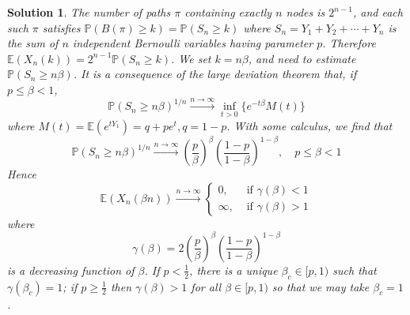 \documentclass[12pt]{amsart}
\newtheorem*{solution}{Solution}
\begin{document}
\begin{solution}
The number of paths $\pi$ containing exactly $n$ nodes is $2^{n-1}$, and each such $\pi$ satisfies $\mathbb{P}(B(\pi) \geq k)=\mathbb{P}(S_n \geq k)$ where $S_n=Y_1+Y_2+\cdots+Y_n$ is the sum of $n$ independent Bernoulli variables having parameter $p$. Therefore $\mathbb{E}(X_n(k))=2^{n-1} \mathbb{P}(S_n \geq k)$. We set $k=n \beta$, and need to estimate $\mathbb{P}(S_n \geq n \beta)$. It is a consequence of the large deviation theorem that, if $p \leq \beta<1$,
$$
\mathbb{P}(S_n \geq n \beta)^{1 / n} \xrightarrow{n \rightarrow \infty} \inf _{t>0}\{e^{-t \beta} M(t)\}
$$
where $M(t)=\mathbb{E}(e^{t Y_1})=q+p e^t, q=1-p$. With some calculus, we find that
$$
\mathbb{P}(S_n \geq n \beta)^{1 / n} \xrightarrow{n \rightarrow \infty}(\frac{p}{\beta})^\beta(\frac{1-p}{1-\beta})^{1-\beta}, \quad p \leq \beta<1
$$
Hence
$$
\mathbb{E}(X_n(\beta n)) \xrightarrow{n \rightarrow \infty} \begin{cases}0, & \text { if } \gamma(\beta)<1 \\ \infty, & \text { if } \gamma(\beta)>1\end{cases}
$$
where
$$
\gamma(\beta)=2(\frac{p}{\beta})^\beta(\frac{1-p}{1-\beta})^{1-\beta}
$$
is a decreasing function of $\beta$. If $p<\frac{1}{2}$, there is a unique $\beta_c \in[p, 1)$ such that $\gamma(\beta_c)=1$; if $p \geq \frac{1}{2}$ then $\gamma(\beta)>1$ for all $\beta \in[p, 1)$ so that we may take $\beta_c=1$.


\end{solution}
\end{document}

